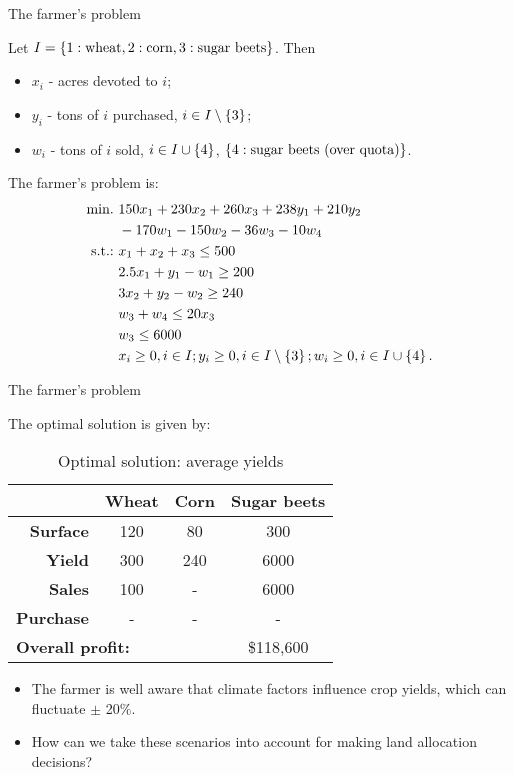 \begin{frame}{The farmer's problem {\small \cite{birge2011introduction}}}
	
	Let $I=\left\{ 1:\text{wheat}, 2:\text{corn}, 3:\text{sugar beets} \right \}$. Then
	\vspace{-6pt}
	\begin{itemize}
		\item $x_i$	- acres devoted to $i$;
		\item $y_i$ - tons of $i$ purchased, $i \in I \setminus \left\{ 3 \right \}$;
		\item $w_i$ - tons of $i$ sold, $i \in I \cup \left\{ 4 \right \}$, $\left\{ 4: \text{sugar beets (over quota)} \right \}$.
	\end{itemize}
	
	\pause
	The farmer's problem is:
	\begin{align*}
		\mathop{\text{min.} \ } & 150x_1 + 230 x_2 + 260 x_3 + 238 y_1 + 210 y_2 \\ & - 170 w_1 - 150 w_2 - 36 w_3 - 10w_4 \\
		\mathop{\text{s.t.:} \ } & x_1 + x_2 + x_3 \le 500 \\
		& 2.5x_1 + y_1 - w_1 \ge 200 \\
		& 3 x_2 + y_2 - w_2 \ge 240 \\
		& w_3 + w_4 \le 20x_3 \\
		& w_3 \le 6000 \\
		& x_i \ge 0, i \in I; y_i \ge 0, i \in I \setminus \left\{ 3 \right \}; w_i \ge 0, i \in I \cup \left\{ 4 \right \}.
	\end{align*}
\end{frame}


\begin{frame}{The farmer's problem {\small \cite{birge2011introduction}}}
	
	The optimal solution is given by:
	\begin{table}
		\begin{tabular}{rccc}
					 & \bf Wheat & \bf Corn & \bf Sugar beets \\ \hline
			\bf Surface	 & 120	 & 80   & 300    	\\
			\bf Yield	 & 300   & 240  & 6000     \\
			\bf Sales    & 100   & -    & 6000     \\  
			\bf Purchase & -     & -    & -        \\ \hline
			\multicolumn{3}{l}{\bf Overall profit:} & \$118,600  \\ \hline 
		\end{tabular}
		\caption{Optimal solution: average yields}
	\end{table}
	\pause
	\begin{itemize}
		\item The farmer is well aware that climate factors influence crop yields, which can \alert{fluctuate} $\pm$ 20\%.	
		\item How can we take these \alert{scenarios} into account for making land allocation decisions?
	\end{itemize}
	
\end{frame}


